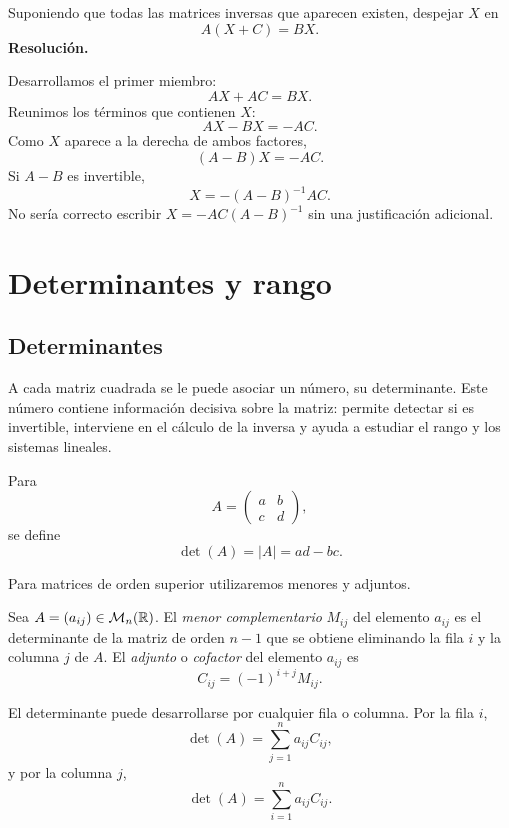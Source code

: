 \begin{solvedexercise}
Suponiendo que todas las matrices inversas que aparecen existen, despejar $X$ en
\[
A(X+C)=BX.
\]
\tcblower
\textbf{Resolución.}\par\smallskip
Desarrollamos el primer miembro:
\[
AX+AC=BX.
\]
Reunimos los términos que contienen $X$:
\[
AX-BX=-AC.
\]
Como $X$ aparece a la derecha de ambos factores,
\[
(A-B)X=-AC.
\]
Si $A-B$ es invertible,
\[
\boxed{X=-(A-B)^{-1}AC.}
\]
No sería correcto escribir $X=-AC(A-B)^{-1}$ sin una justificación adicional.
\end{solvedexercise}

\section{Determinantes y rango}
\label{sec:determinantes-rango}

\subsection{Determinantes}

A cada matriz cuadrada se le puede asociar un número, su determinante. Este número contiene información decisiva sobre la matriz: permite detectar si es invertible, interviene en el cálculo de la inversa y ayuda a estudiar el rango y los sistemas lineales.

\begin{definition}
Para
\[
A=\begin{pmatrix}a&b\\c&d\end{pmatrix},
\]
se define
\[
\det(A)=|A|=ad-bc.
\]
\end{definition}

Para matrices de orden superior utilizaremos menores y adjuntos.

\begin{definition}
Sea $A=(a_{ij})\in\mathcal M_n(\mathbb{R})$. El \emph{menor complementario} $M_{ij}$ del elemento $a_{ij}$ es el determinante de la matriz de orden $n-1$ que se obtiene eliminando la fila $i$ y la columna $j$ de $A$. El \emph{adjunto} o \emph{cofactor} del elemento $a_{ij}$ es
\[
C_{ij}=(-1)^{i+j}M_{ij}.
\]
\end{definition}

El determinante puede desarrollarse por cualquier fila o columna. Por la fila $i$,
\[
\det(A)=\sum_{j=1}^n a_{ij}C_{ij},
\]
y por la columna $j$,
\[
\det(A)=\sum_{i=1}^n a_{ij}C_{ij}.
\]

